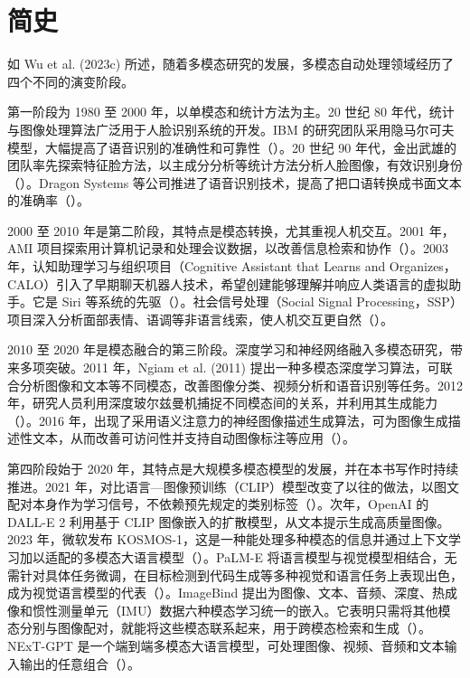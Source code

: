 \section{简史}
如 Wu et al. (2023c) 所述，随着多模态研究的发展，多模态自动处理领域经历了四个不同的演变阶段。

第一阶段为 1980 至 2000 年，以单模态和统计方法为主。20 世纪 80 年代，统计与图像处理算法广泛用于人脸识别系统的开发。IBM 的研究团队采用隐马尔可夫模型，大幅提高了语音识别的准确性和可靠性（）。20 世纪 90 年代，金出武雄的团队率先探索特征脸方法，以主成分分析等统计方法分析人脸图像，有效识别身份（）。Dragon Systems 等公司推进了语音识别技术，提高了把口语转换成书面文本的准确率（）。

2000 至 2010 年是第二阶段，其特点是模态转换，尤其重视人机交互。2001 年，AMI 项目探索用计算机记录和处理会议数据，以改善信息检索和协作（）。2003 年，认知助理学习与组织项目（Cognitive Assistant that Learns and Organizes，CALO）引入了早期聊天机器人技术，希望创建能够理解并响应人类语言的虚拟助手。它是 Siri 等系统的先驱（）。社会信号处理（Social Signal Processing，SSP）项目深入分析面部表情、语调等非语言线索，使人机交互更自然（）。

2010 至 2020 年是模态融合的第三阶段。深度学习和神经网络融入多模态研究，带来多项突破。2011 年，Ngiam et al. (2011) 提出一种多模态深度学习算法，可联合分析图像和文本等不同模态，改善图像分类、视频分析和语音识别等任务。2012 年，研究人员利用深度玻尔兹曼机捕捉不同模态间的关系，并利用其生成能力（）。2016 年，出现了采用语义注意力的神经图像描述生成算法，可为图像生成描述性文本，从而改善可访问性并支持自动图像标注等应用（）。

第四阶段始于 2020 年，其特点是大规模多模态模型的发展，并在本书写作时持续推进。2021 年，对比语言—图像预训练（CLIP）模型改变了以往的做法，以图文配对本身作为学习信号，不依赖预先规定的类别标签（）。次年，OpenAI 的 DALL-E 2 利用基于 CLIP 图像嵌入的扩散模型，从文本提示生成高质量图像。2023 年，微软发布 KOSMOS-1，这是一种能处理多种模态的信息并通过上下文学习加以适配的多模态大语言模型（）。PaLM-E 将语言模型与视觉模型相结合，无需针对具体任务微调，在目标检测到代码生成等多种视觉和语言任务上表现出色，成为视觉语言模型的代表（）。ImageBind 提出为图像、文本、音频、深度、热成像和惯性测量单元（IMU）数据六种模态学习统一的嵌入。它表明只需将其他模态分别与图像配对，就能将这些模态联系起来，用于跨模态检索和生成（）。NExT-GPT 是一个端到端多模态大语言模型，可处理图像、视频、音频和文本输入输出的任意组合（）。

